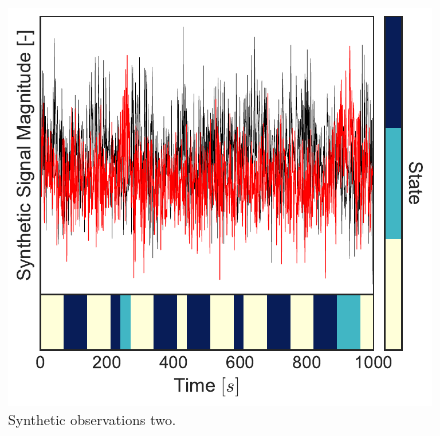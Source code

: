 \documentclass[aspectratio=169]{beamer}
\begin{document}
\begin{frame}
\begin{columns}[c]
            \begin{figure}
                \includegraphics[width=1.0\linewidth]{synthetic-data-plot-data2.pdf}
                \caption{Synthetic observations two.}
            \end{figure}

        \end{columns}

    \end{frame}

\end{document}
